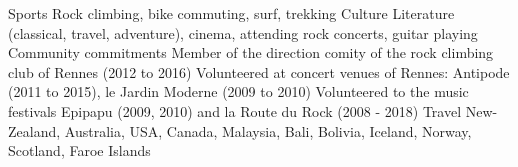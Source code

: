 \begin{cvskills}
  \cvskill
    {Sports}
	{Rock climbing, bike commuting, surf, trekking}
  \cvskill
    {Culture}
	{
        Literature (classical, travel, adventure), cinema, attending rock
        concerts, guitar playing
	}
  \cvskill
    {Community commitments}
	{
        Member of the direction comity of the rock climbing club of Rennes
        (2012 to 2016)\newline
        Volunteered at concert venues of Rennes: Antipode (2011 to 2015), le
        Jardin Moderne (2009 to 2010)\lastnewline
        Volunteered to the music festivals Epipapu (2009, 2010) and la Route du
        Rock (2008 - 2018)
    }
  \cvskill
    {Travel}
    {New-Zealand, Australia, USA, Canada, Malaysia, Bali, Bolivia, Iceland,
    Norway, Scotland, Faroe Islands}
\end{cvskills}
